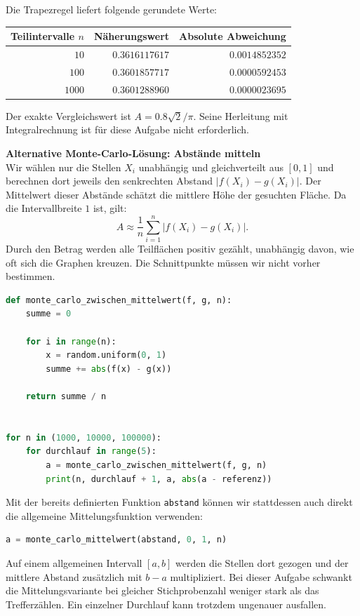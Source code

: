 \begin{myexercise}
\begin{myanswer}
Die Trapezregel liefert folgende gerundete Werte:
\begin{center}
    \begin{tabular}{rrr}
        \toprule
        Teilintervalle $n$ & Näherungswert & Absolute Abweichung \\
        \midrule
        $10$ & $0.3616117617$ & $0.0014852352$ \\
        $100$ & $0.3601857717$ & $0.0000592453$ \\
        $1000$ & $0.3601288960$ & $0.0000023695$ \\
        \bottomrule
    \end{tabular}
\end{center}
Der exakte Vergleichswert ist $A=0.8\sqrt{2}/\pi$. Seine Herleitung mit Integralrechnung ist für diese Aufgabe nicht erforderlich.

\textbf{Alternative Monte-Carlo-Lösung: Abstände mitteln}\\
Wir wählen nur die Stellen $X_i$ unabhängig und gleichverteilt aus $[0,1]$ und berechnen dort jeweils den senkrechten Abstand $|f(X_i)-g(X_i)|$. Der Mittelwert dieser Abstände schätzt die mittlere Höhe der gesuchten Fläche. Da die Intervallbreite $1$ ist, gilt:
\[
    A\approx\frac{1}{n}\sum_{i=1}^{n}|f(X_i)-g(X_i)|.
\]
Durch den Betrag werden alle Teilflächen positiv gezählt, unabhängig davon, wie oft sich die Graphen kreuzen. Die Schnittpunkte müssen wir nicht vorher bestimmen.

\begin{lstlisting}[language=Python, caption={Alternative: zufällige Abstände mitteln}]
def monte_carlo_zwischen_mittelwert(f, g, n):
    summe = 0

    for i in range(n):
        x = random.uniform(0, 1)
        summe += abs(f(x) - g(x))

    return summe / n


for n in (1000, 10000, 100000):
    for durchlauf in range(5):
        a = monte_carlo_zwischen_mittelwert(f, g, n)
        print(n, durchlauf + 1, a, abs(a - referenz))
\end{lstlisting}

Mit der bereits definierten Funktion \lstinline|abstand| können wir stattdessen auch direkt die allgemeine Mittelungsfunktion verwenden:
\begin{lstlisting}[language=Python]
a = monte_carlo_mittelwert(abstand, 0, 1, n)
\end{lstlisting}
Auf einem allgemeinen Intervall $[a,b]$ werden die Stellen dort gezogen und der mittlere Abstand zusätzlich mit $b-a$ multipliziert. Bei dieser Aufgabe schwankt die Mittelungsvariante bei gleicher Stichprobenzahl weniger stark als das Trefferzählen. Ein einzelner Durchlauf kann trotzdem ungenauer ausfallen.


\end{myanswer}
\end{myexercise}
